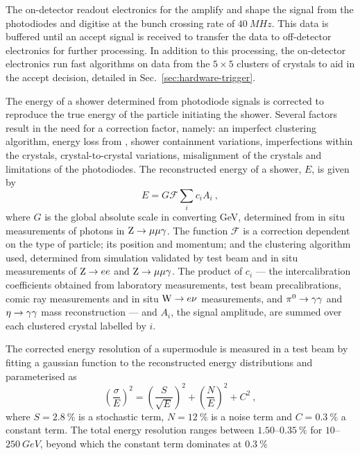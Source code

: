 The on-detector readout electronics for the \ECAL amplify and shape the signal from the photodiodes and digitise at the bunch crossing rate of ${\SI{40}{MHz}}$. This data is buffered until an accept signal is received to transfer the data to off-detector electronics for further processing. In addition to this processing, the on-detector electronics run fast algorithms on data from the ${5\times 5}$ clusters of crystals to aid in the accept decision, detailed in Sec.~\ref{sec:hardware-trigger}.

The energy of a shower determined from photodiode signals is corrected to reproduce the true energy of the particle initiating the shower. Several factors result in the need for a correction factor, namely: an imperfect clustering algorithm, energy loss from \brem, shower containment variations, imperfections within the crystals, crystal-to-crystal variations, misalignment of the crystals and limitations of the photodiodes. The reconstructed energy of a shower, $E$, is given by
%
\begin{equation}
    E = G\mathcal{F}\sum_i c_i A_i\ ,
\end{equation}
%
where $G$ is the global absolute scale in converting GeV, determined from in situ measurements of photons in ${\mathrm{Z}\rightarrow\mu\mu\gamma}$. The function $\mathcal{F}$ is a correction dependent on the type of particle; its position and momentum; and the clustering algorithm used, determined from simulation validated by test beam and in situ measurements of ${\mathrm{Z}\rightarrow ee}$ and ${\mathrm{Z}\rightarrow\mu\mu\gamma}$. The product of $c_i$ --- the intercalibration coefficients obtained from laboratory measurements, test beam precalibrations, comic ray measurements and in situ ${\mathrm{W}\rightarrow e\nu}$ measurements, and ${\pi^{0}\rightarrow\gamma\gamma}$ and ${\eta\rightarrow\gamma\gamma}$ mass reconstruction --- and $A_i$, the signal amplitude, are summed over each clustered crystal labelled by $i$.

The corrected energy resolution of a supermodule is measured in a test beam by fitting a gaussian function to the reconstructed energy distributions and parameterised as
%
\begin{equation}
    \left(\frac{\sigma}{E}\right)^{2} = \left(\frac{S}{\sqrt{E}} \right)^{2}
    + \left( \frac{N}{E} \right)^{2} + C^2\ ,
\end{equation}
%
where $S=\SI{2.8}{\%}$ is a stochastic term, $N=\SI{12}{\%}$ is a noise term and $C=\SI{0.3}{\%}$ a constant term. The total energy resolution ranges between {$1.50$--$\SI{0.35}{\%}$} for {$10$--$\SI{250}{GeV}$}, beyond which the constant term dominates at $\SI{0.3}{\%}$


